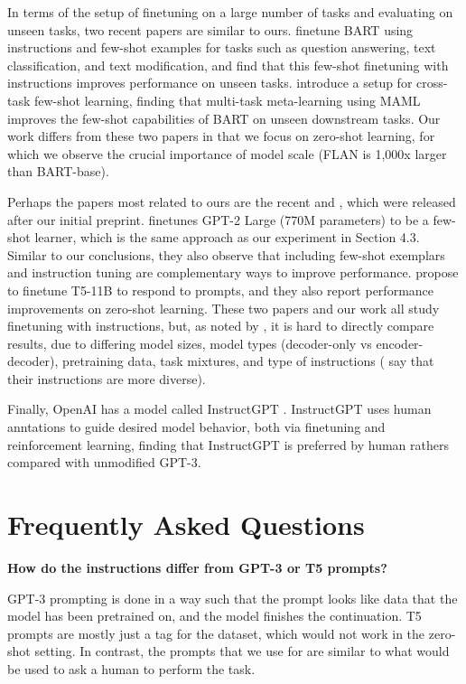 In terms of the setup of finetuning on a large number of tasks and evaluating on unseen tasks, two recent papers are similar to ours. 
\citet{mishra2021natural} finetune BART \citep{lewis-etal-2020-bart} using instructions and few-shot examples for tasks such as question answering, text classification, and text modification, and find that this few-shot finetuning with instructions improves performance on unseen tasks.
\citet{ye2021crossfit} introduce a setup for cross-task few-shot learning, finding that multi-task meta-learning using MAML \citep{finn2017model} improves the few-shot capabilities of BART on unseen downstream tasks.
Our work differs from these two papers in that we focus on zero-shot learning, for which we observe the crucial importance of model scale (FLAN is 1,000x larger than BART-base).

Perhaps the papers most related to ours are the recent \citet{sanh2021multitask} and \citet{min2021metaicl}, which were released after our initial preprint. \citet{min2021metaicl} finetunes GPT-2 Large (770M parameters) to be a few-shot learner, which is the same approach as our experiment in Section 4.3. Similar to our conclusions, they also observe that including few-shot exemplars and instruction tuning are complementary ways to improve performance. \citet{sanh2021multitask} propose to finetune T5-11B to respond to prompts, and they also report performance improvements on zero-shot learning. These two papers and our work all study finetuning with instructions, but, as noted by \citet{min2021metaicl}, it is hard to directly compare results, due to differing model sizes, model types (decoder-only vs encoder-decoder), pretraining data, task mixtures, and type of instructions (\citet{sanh2021multitask} say that their instructions are more diverse).

Finally, OpenAI has a model called InstructGPT \citep{ouyang2022instructgpt}. 
InstructGPT uses human anntations to guide desired model behavior, both via finetuning and reinforcement learning, finding that InstructGPT is preferred by human rathers compared with unmodified GPT-3.

\clearpage
\section{Frequently Asked Questions}\label{sec:faq}

\textbf{How do the \flan{} instructions differ from GPT-3 or T5 prompts?}

GPT-3 prompting is done in a way such that the prompt looks like data that the model has been pretrained on, and the model finishes the continuation. 
T5 prompts are mostly just a tag for the dataset, which would not work in the zero-shot setting. 
In contrast, the prompts that we use for \flan{} are similar to what would be used to ask a human to perform the task.

